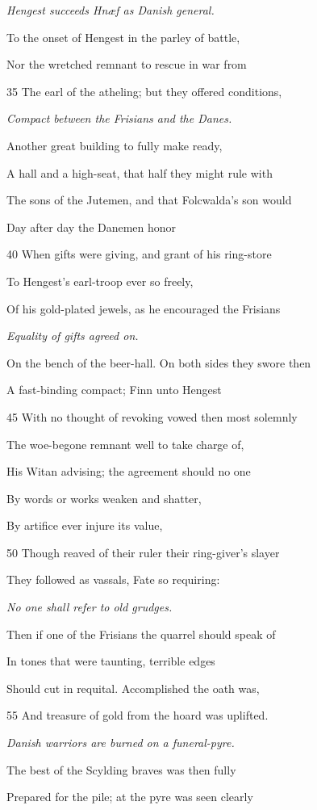 \emph{Hengest succeeds
Hnæf as Danish
general.}

To the onset of Hengest in the parley of battle,

Nor the wretched remnant to rescue in war from

35
The earl of the atheling; but they offered conditions,

\emph{Compact between
the Frisians and the
Danes.}

Another great building to fully make ready,

A hall and a high-seat, that half they might rule with

The sons of the Jutemen, and that Folcwalda’s son would

Day after day the Danemen honor

40
When gifts were giving, and grant of his ring-store

To Hengest’s earl-troop ever so freely,

Of his gold-plated jewels, as he encouraged the Frisians

\emph{Equality of gifts
agreed on.}

On the bench of the beer-hall. On both sides they swore then

A fast-binding compact; Finn unto Hengest

45
With no thought of revoking vowed then most solemnly

The woe-begone remnant well to take charge of,

His Witan advising; the agreement should no one

By words or works weaken and shatter,

By artifice ever injure its value,

50
Though reaved of their ruler their ring-giver’s slayer

They followed as vassals, Fate so requiring:

\emph{No one shall refer
to old grudges.}

Then if one of the Frisians the quarrel should speak of

In tones that were taunting, terrible edges

Should cut in requital. Accomplished the oath was,

55
And treasure of gold from the hoard was uplifted.

\emph{Danish warriors
are burned on a
funeral-pyre.}

The best of the Scylding braves was then fully

Prepared for the pile; at the pyre was seen clearly

